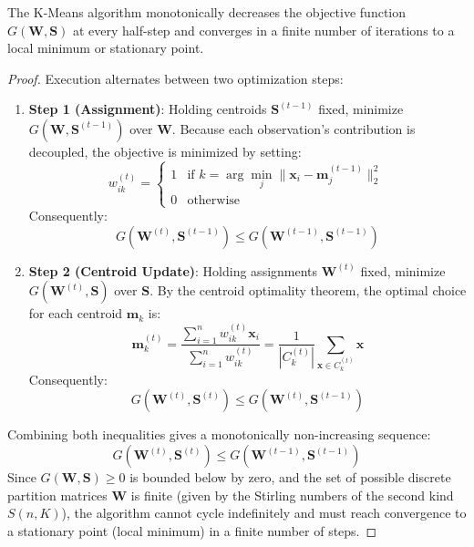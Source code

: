 \begin{theorem}
The K-Means algorithm monotonically decreases the objective function $G(\mathbf{W}, \mathbf{S})$ at every half-step and converges in a finite number of iterations to a local minimum or stationary point.
\end{theorem}

\begin{proof}
Execution alternates between two optimization steps:
\begin{enumerate}
    \item \textbf{Step 1 (Assignment)}: Holding centroids $\mathbf{S}^{(t-1)}$ fixed, minimize $G(\mathbf{W}, \mathbf{S}^{(t-1)})$ over $\mathbf{W}$. Because each observation's contribution is decoupled, the objective is minimized by setting:
    \begin{equation}
        w_{ik}^{(t)} = \begin{cases}
            1 & \text{if } k = \arg\min_{j} \|\mathbf{x}_i - \mathbf{m}_j^{(t-1)}\|_2^2 \\
            0 & \text{otherwise}
        \end{cases}
    \end{equation}
    Consequently:
    \begin{equation}
        G(\mathbf{W}^{(t)}, \mathbf{S}^{(t-1)}) \le G(\mathbf{W}^{(t-1)}, \mathbf{S}^{(t-1)})
    \end{equation}
    \item \textbf{Step 2 (Centroid Update)}: Holding assignments $\mathbf{W}^{(t)}$ fixed, minimize $G(\mathbf{W}^{(t)}, \mathbf{S})$ over $\mathbf{S}$. By the centroid optimality theorem, the optimal choice for each centroid $\mathbf{m}_k$ is:
    \begin{equation}
        \mathbf{m}_k^{(t)} = \frac{\sum_{i=1}^n w_{ik}^{(t)} \mathbf{x}_i}{\sum_{i=1}^n w_{ik}^{(t)}} = \frac{1}{|C_k^{(t)}|} \sum_{\mathbf{x} \in C_k^{(t)}} \mathbf{x}
    \end{equation}
    Consequently:
    \begin{equation}
        G(\mathbf{W}^{(t)}, \mathbf{S}^{(t)}) \le G(\mathbf{W}^{(t)}, \mathbf{S}^{(t-1)})
    \end{equation}
\end{enumerate}
Combining both inequalities gives a monotonically non-increasing sequence:
\begin{equation}
    G(\mathbf{W}^{(t)}, \mathbf{S}^{(t)}) \le G(\mathbf{W}^{(t-1)}, \mathbf{S}^{(t-1)})
\end{equation}
Since $G(\mathbf{W}, \mathbf{S}) \ge 0$ is bounded below by zero, and the set of possible discrete partition matrices $\mathbf{W}$ is finite (given by the Stirling numbers of the second kind $S(n, K)$), the algorithm cannot cycle indefinitely and must reach convergence to a stationary point (local minimum) in a finite number of steps.
\end{proof}

